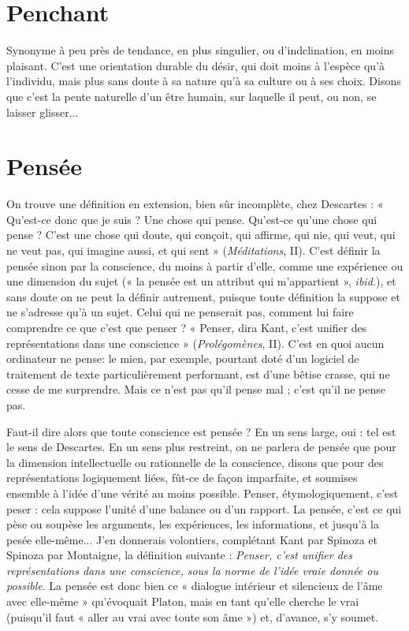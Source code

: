 \section{Penchant}
Synonyme à peu près de tendance, en plus singulier, ou d’indclination,
en moins plaisant. C’est une orientation durable du
désir, qui doit moins à l'espèce qu’à l'individu, mais plus sans doute à sa nature
qu’à sa culture ou à ses choix. Disons que c’est la pente naturelle d’un être
humain, sur laquelle il peut, ou non, se laisser glisser...

\section{Pensée}
On trouve une définition en extension, bien sûr incomplète, chez
Descartes : « Qu'est-ce donc que je suis ? Une chose qui pense.
Qu'est-ce qu’une chose qui pense ? C’est une chose qui doute, qui conçoit, qui
affirme, qui nie, qui veut, qui ne veut pas, qui imagine aussi, et qui sent »
({\it Méditations}, II). C’est définir la pensée sinon par la conscience, du moins à
partir d’elle, comme une expérience ou une dimension du sujet (« la pensée est
un attribut qui m’appartient », {\it ibid.}), et sans doute on ne peut la définir autrement,
puisque toute définition la suppose et ne s'adresse qu’à un sujet. Celui
qui ne penserait pas, comment lui faire comprendre ce que c’est que penser ?
« Penser, dira Kant, c’est unifier des représentations dans une conscience »
({\it Prolégomènes}, II). C’est en quoi aucun ordinateur ne pense: le mien, par
exemple, pourtant doté d’un logiciel de traitement de texte particulièrement
performant, est d’une bêtise crasse, qui ne cesse de me surprendre. Mais ce n’est
pas qu’il pense mal ; c’est qu’il ne pense pas.

Faut-il dire alors que toute conscience est pensée ? En un sens large, oui :
tel est le sens de Descartes. En un sens plus restreint, on ne parlera de pensée
que pour la dimension intellectuelle ou rationnelle de la conscience, disons
que pour des représentations logiquement liées, fût-ce de façon imparfaite, et
soumises ensemble à l’idée d’une vérité au moins possible. Penser, étymologiquement,
c'est peser : cela suppose l’unité d’une balance ou d’un rapport.
La pensée, c’est ce qui pèse ou soupèse les arguments, les expériences, les
informations, et jusqu’à la pesée elle-même... J'en donnerais volontiers,
complétant Kant par Spinoza et Spinoza par Montaigne, la définition
suivante : {\it Penser, c'est unifier des représentations dans une conscience, sous la
norme de l'idée vraie donnée ou possible}. La pensée est donc bien ce « dialogue
intérieur et silencieux de l’âme avec elle-même » qu’évoquait Platon, mais en
tant qu’elle cherche le vrai (puisqu'il faut « aller au vrai avec toute son âme »)
et, d'avance, s’y soumet.

